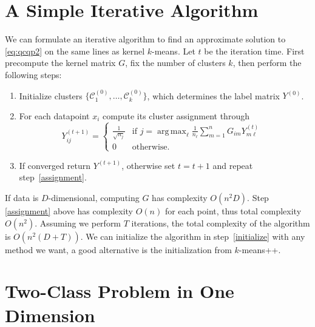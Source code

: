 \documentclass{article}
\DeclareMathOperator*{\argmax}{arg\,max}
\newcommand\C{{\mathcal{C}}}
\newcommand\Zt{Y}
\begin{document}
\section{A Simple Iterative Algorithm}
\label{sec:iterative_algo}

We can formulate an iterative algorithm to find
an approximate solution to \eqref{eq:qcqp2} on the same lines
as kernel $k$-means.
Let $t$ be the iteration time. First precompute the kernel
matrix $G$, fix the number of clusters $k$, then
perform the following steps:
\begin{enumerate}
\item \label{initialize} 
Initialize clusters $\{ \C_1^{(0)},\dotsc,\C_k^{(0)} \}$, which
determines the label matrix $\Zt^{(0)}$.
\item \label{assignment} For each datapoint $x_i$ compute
its cluster assignment through
\begin{equation}
\label{eq:algo}
\Zt^{(t+1)}_{ij} = 
\begin{cases}
\tfrac{1}{\sqrt{n_j}} & \mbox{if $j = \argmax_\ell \tfrac{1}{n_\ell} 
\sum_{m=1}^n G_{i m} \Zt^{(t)}_{m\ell}$ } \\
0 & \mbox{otherwise.}
\end{cases}
\end{equation}
\item If converged return $\Zt^{(t+1)}$, otherwise
set $t = t+1$ and repeat step~\ref{assignment}.
\end{enumerate}
If data is $D$-dimensional, computing $G$ has complexity
$O(n^2 D)$. Step \ref{assignment} above has complexity $O(n)$ for
each point, thus total complexity $O(n^2)$. Assuming we perform $T$ 
iterations,
the total complexity of the algorithm is $O(n^2(D + T))$.
We can initialize the algorithm in step~\ref{initialize} with any method
we want, a good alternative is the initialization from $k$-means++.


\section{Two-Class Problem in One Dimension}
\end{document}
